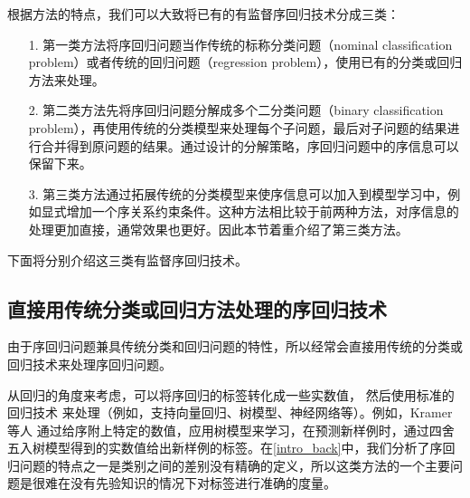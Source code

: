 根据方法的特点，我们可以大致将已有的有监督序回归技术分成三类：
\begin{enumerate}
\item[1.]第一类方法将序回归问题当作传统的标称分类问题（nominal classification problem）或者传统的回归问题（regression problem），使用已有的分类或回归方法来处理。
\item[2.]第二类方法先将序回归问题分解成多个二分类问题（binary classification problem），再使用传统的分类模型来处理每个子问题，最后对子问题的结果进行合并得到原问题的结果。通过设计的分解策略，序回归问题中的序信息可以保留下来。
\item[3.]第三类方法通过拓展传统的分类模型来使序信息可以加入到模型学习中，例如显式增加一个序关系约束条件。这种方法相比较于前两种方法，对序信息的处理更加直接，通常效果也更好。因此本节着重介绍了第三类方法。
\end{enumerate}

下面将分别介绍这三类有监督序回归技术。



\subsection{直接用传统分类或回归方法处理的序回归技术}
由于序回归问题兼具传统分类和回归问题的特性，所以经常会直接用传统的分类或回归技术来处理序回归问题。

从回归的角度来考虑，可以将序回归的标签转化成一些实数值\citep{torra2006regression}，
然后使用标准的回归技术\citep{bishop2006pattern}\citep{murphy2012machine}
来处理（例如，支持向量回归、树模型、神经网络等）。例如，Kramer等人\citep{kramer2001prediction}
通过给序附上特定的数值，应用树模型来学习，在预测新样例时，通过四舍五入树模型得到的实数值给出新样例的标签。在\autoref{intro_back}中，我们分析了序回归问题的特点之一是类别之间的差别没有精确的定义，所以这类方法的一个主要问题是很难在没有先验知识的情况下对标签进行准确的度量。

